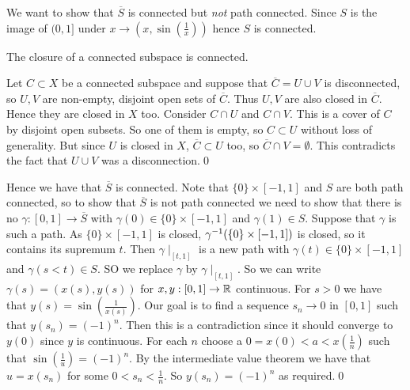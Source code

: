\documentclass{article}
\begin{document}
We want to show that $ \overline S $ is connected but \textit{not} path connected. Since $ S $ is the image of $ (0,1] $ under $ x\to \left(x,\sin\left(\frac 1x\right)\right) $ hence $ S $ is connected.
\begin{lemma}
  The closure of a connected subspace is connected.
\end{lemma}
\pf Let $ C\subset X $ be a connected subspace and suppose that $ \overline C = U\cup V $ is disconnected, so $ U,V $ are non-empty, disjoint open sets of $ \overline C $. Thus $ U,V $ are also closed in $ \overline C $. Hence they are closed in $ X $ too. Consider $ C\cap U $ and $ C\cap V $. This is a cover of $ C $ by disjoint open subsets. So one of them is empty, so $ C\subset U $ without loss of generality. But since $ U $ is closed in $ X $, $ \overline C\subset U $ too, so $ \overline C \cap V = \emptyset $. This contradicts the fact that $ U\cup V $ was a disconnection.\qed
\par
Hence we have that $ \overline S $ is connected. Note that $ \{0\}\times [-1,1] $ and $ S $ are both path connected, so to show that $ \overline S $ is not path connected we need to show that there is no $ \gamma:[0,1]\to \overline S $ with $ \gamma(0) \in \{0\}\times [-1,1] $ and $ \gamma(1)\in S $. Suppose that $ \gamma $ is such a path. As $ \{0\}\times [-1,1] $ is closed, $ {\gamma}^{-1}(\{0\}\times [-1,1]) $ is closed, so it contains its supremum $ t $. Then $ \gamma\mid_{[t,1]} $ is a new path with $ \gamma(t)\in \{0\} \times [-1,1] $ and $ \gamma(s<t)\in S $. SO we replace $ \gamma $ by $ \gamma\mid_{[t,1]} $. So we can write $ \gamma(s) = (x(s),y(s)) $ for $ x,y:[0,1]\to \mathbb{R} $ continuous. For $ s>0 $ we have that $ y(s) = \sin\left(\frac 1 {x(s)}\right) $. Our goal is to find a sequence $ s_n\to 0 $ in $ [0,1] $ such that $ y(s_n) = (-1)^n $. Then this is a contradiction since it should converge to $ y(0) $ since $ y $ is continuous. For each $ n $ choose a $ 0=x(0)<a<x\left(\frac 1n\right) $ such that $ \sin\left(\frac 1u\right)=(-1)^n $. By the intermediate value theorem we have that $ u=x(s_n) $ for some $ 0<s_n<\frac 1n $. So $ y(s_n) = (-1)^n $ as required.\qed
\end{document}
